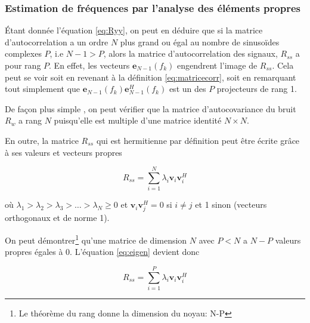 \documentclass{article}
\begin{document}
\newpage


\subsubsection{Estimation de fréquences par l'analyse des éléments propres}

Étant donnée l'équation \ref{eq:Ryy}, on peut en déduire que si la matrice d'autocorrelation a un ordre \(N\) plus grand ou égal au nombre de sinusoïdes complexes \(P\), i.e \(N - 1 > P\), alors la matrice d'autocorrelation des signaux, \(R_{ss}\) a pour rang \(P\). 
En effet, les vecteurs \( \boldsymbol{e}_{N-1}(f_k) \) engendrent l'image de \(R_{ss}\).
Cela peut se voir soit en revenant à la définition \ref{eq:matricecorr}, soit en remarquant tout simplement que \( \boldsymbol{e}_{N-1}(f_k) \boldsymbol{e}_{N-1}^H(f_k)\) est un des \(P\) projecteurs de rang 1.

\vspace*{10pt}

De façon plus simple , on peut vérifier que la matrice d'autocovariance du bruit \(R_w\) a rang \(N\) puisqu'elle est multiple d'une matrice identité \(N\times N\).

\vspace*{20pt}

En outre, la matrice \(R_{ss}\) qui est hermitienne par définition peut être écrite grâce à ses valeurs et vecteurs propres

\begin{equation}
\label{eq:eigen}
R_{ss}=\sum_{i=1}^{N}\lambda _i \boldsymbol{v}_{i} \boldsymbol{v}_{i}^H
\end{equation}

où \(\lambda _1 > \lambda _2 > \lambda _3 > \hdots > \lambda _N  \geq 0\) et \(\boldsymbol{v}_{i} \boldsymbol{v}_{j}^H = 0\) si \(i \neq j\) et 1 sinon (vecteurs orthogonaux et de norme 1). 

\vspace*{20pt}

On peut démontrer\footnote{ Le théorème du rang donne la dimension du noyau: N-P} qu'une matrice de dimension \(N\) avec \(P < N\) a \(N - P\) valeurs propres égales à 0. L'équation \ref{eq:eigen} devient donc 

\begin{equation}
\label{eq:eigenM}
R_{ss}=\sum_{i=1}^{P}\lambda _i \boldsymbol{v}_{i} \boldsymbol{v}_{i}^H
\end{equation}
\end{document}
